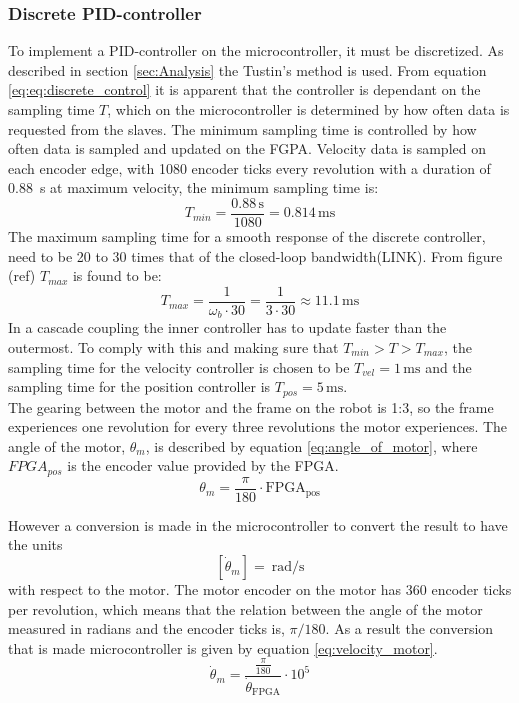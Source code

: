 \documentclass[../../main.tex]{subfiles}
\begin{document}
\subsubsection*{Discrete PID-controller}
To implement a PID-controller on the microcontroller, it must be discretized. As described in section \ref{sec:Analysis} the Tustin's method is used.
From equation \ref{eq:eq:discrete_control} it is apparent that the controller is dependant on the sampling time $T$, which on the microcontroller is determined by how often data is requested from the slaves. The minimum sampling time is controlled by how often data is sampled and updated on the FGPA. Velocity data is sampled on each encoder edge, with 1080 encoder ticks every revolution with a duration of \SI{0,88}{\second} \cite{} at maximum velocity, the minimum sampling time is:
\begin{equation}
    T_{min} = \frac{0.88\,\mathrm{s}}{1080} = 0.814\,\mathrm{ms}
\end{equation}
The maximum sampling time for a smooth response of the discrete controller, need to be 20 to 30 times that of the closed-loop bandwidth(LINK). From figure (ref) $T_{max}$ is found to be:
\begin{equation}
    T_{max} = \frac{1}{\omega_b\cdot 30} = \frac{1}{3 \cdot 30} \approx 11.1\,\mathrm{ms}
\end{equation}
In a cascade coupling the inner controller has to update faster than the outermost. To comply with this and making sure that $T_{min} > T > T_{max}$, the sampling time for the velocity controller is chosen to be $T_{vel} = 1\,\mathrm{ms}$ and the sampling time for the position controller is $T_{pos} = 5\,\mathrm{ms}$. \\


The gearing between the motor and the frame on the robot is 1:3, so the frame experiences one revolution for every three revolutions the motor experiences. The angle of the motor, $ \theta_{m} $, is described by equation \ref{eq:angle_of_motor}, where $FPGA_{pos}$ is the encoder value provided by the FPGA.
\begin{equation}\label{eq:angle_of_motor}
     \theta_{m} = \frac{\pi}{180} \cdot \mathrm{FPGA_{pos}}
\end{equation}


However a conversion is made in the microcontroller to convert the result to have the units \[ \left[ \dot{\theta}_m \right] = \SI{}{\radian \per \second } \] with respect to the motor. The motor encoder on the motor has 360 encoder ticks per revolution, which means that the relation between the angle of the motor measured in radians and the encoder ticks is, $\pi / 180$. As a result the conversion that is made microcontroller is given by equation \ref{eq:velocity_motor}.
\begin{equation}\label{eq:velocity_motor}
    \dot{\theta}_{m} = \frac{\frac{\pi}{180}}{ \dot{\theta}_{\mathrm{FPGA}} }\cdot 10^{5}
\end{equation}
\end{document}
